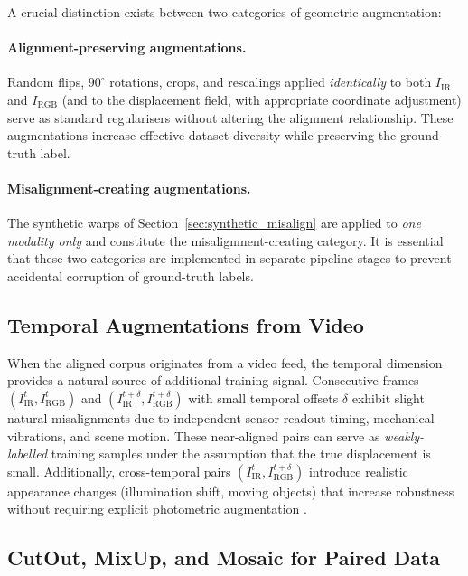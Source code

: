 A crucial distinction exists between two categories of geometric
augmentation:

\paragraph{Alignment-preserving augmentations.}
Random flips, $90^{\circ}$ rotations, crops, and rescalings applied
\emph{identically} to both $I_{\mathrm{IR}}$ and $I_{\mathrm{RGB}}$ (and to
the displacement field, with appropriate coordinate adjustment) serve as
standard regularisers without altering the alignment relationship.  These
augmentations increase effective dataset diversity while preserving the
ground-truth label.

\paragraph{Misalignment-creating augmentations.}
The synthetic warps of Section~\ref{sec:synthetic_misalign} are applied to
\emph{one modality only} and constitute the misalignment-creating category.
It is essential that these two categories are implemented in separate pipeline
stages to prevent accidental corruption of ground-truth labels.

\subsection{Temporal Augmentations from Video}
\label{subsec:temporal}

When the aligned corpus originates from a video feed, the temporal dimension
provides a natural source of additional training signal.  Consecutive frames
$(I^{t}_{\mathrm{IR}}, I^{t}_{\mathrm{RGB}})$ and
$(I^{t+\delta}_{\mathrm{IR}}, I^{t+\delta}_{\mathrm{RGB}})$ with small
temporal offsets $\delta$ exhibit slight natural misalignments due to
independent sensor readout timing, mechanical vibrations, and scene motion.
These near-aligned pairs can serve as \emph{weakly-labelled} training samples
under the assumption that the true displacement is small.
Additionally, cross-temporal pairs
$(I^{t}_{\mathrm{IR}}, I^{t+\delta}_{\mathrm{RGB}})$ introduce realistic
appearance changes (illumination shift, moving objects) that increase
robustness without requiring explicit photometric augmentation
\cite{liu2020learning}.

\subsection{CutOut, MixUp, and Mosaic for Paired Data}
\label{subsec:cutmix}

